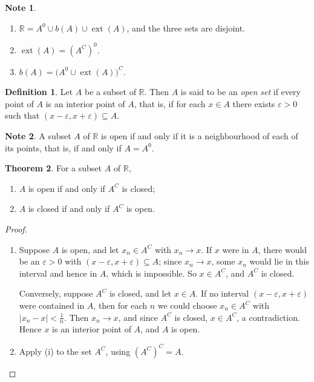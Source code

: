 \documentclass[11pt,a4paper]{article}
\numberwithin{equation}{section}
\theoremstyle{definition}
\newtheorem{thm}{Theorem}[subsection]
\newtheorem{defn}[thm]{Definition}
\newtheorem*{note}{Note}
\begin{document}
\begin{note}
\begin{enumerate}
\item[(i)] $\mathbb{R} = A^0 \cup b(A) \cup \operatorname{ext}(A)$, and the three sets are disjoint.
\item[(ii)] $\operatorname{ext}(A) = (A^C)^0$.
\item[(iii)] $b(A) = \bigl( A^0 \cup \operatorname{ext}(A) \bigr)^C$.
\end{enumerate}
\end{note}


\begin{defn}
Let $A$ be a subset of $\mathbb{R}$. Then $A$ is said to be an \emph{open set} if every point of $A$ is an interior point of $A$, that is, if for each $x \in A$ there exists $\varepsilon > 0$ such that $(x - \varepsilon, x + \varepsilon) \subseteq A$.
\end{defn}

\begin{note}
A subset $A$ of $\mathbb{R}$ is open if and only if it is a neighbourhood of each of its points, that is, if and only if $A = A^0$.
\end{note}


\begin{thm}\label{thm:openclosed}
For a subset $A$ of $\mathbb{R}$,
\begin{enumerate}
\item[(i)] $A$ is open if and only if $A^C$ is closed;
\item[(ii)] $A$ is closed if and only if $A^C$ is open.
\end{enumerate}
\end{thm}

\begin{proof}
\begin{enumerate}
\item[(i)] Suppose $A$ is open, and let $x_n\in A^C$ with $x_n\longrightarrow x$. If $x$ were in $A$, there would be an $\varepsilon>0$ with $(x-\varepsilon,x+\varepsilon)\subseteq A$; since $x_n\longrightarrow x$, some $x_n$ would lie in this interval and hence in $A$, which is impossible. So $x\in A^C$, and $A^C$ is closed.

Conversely, suppose $A^C$ is closed, and let $x\in A$. If no interval $(x-\varepsilon,x+\varepsilon)$ were contained in $A$, then for each $n$ we could choose $x_n\in A^C$ with $|x_n - x|<\frac{1}{n}$. Then $x_n\longrightarrow x$, and since $A^C$ is closed, $x\in A^C$, a contradiction. Hence $x$ is an interior point of $A$, and $A$ is open.

\item[(ii)] Apply (i) to the set $A^C$, using $(A^C)^C = A$.
\end{enumerate}
\end{proof}
\end{document}
